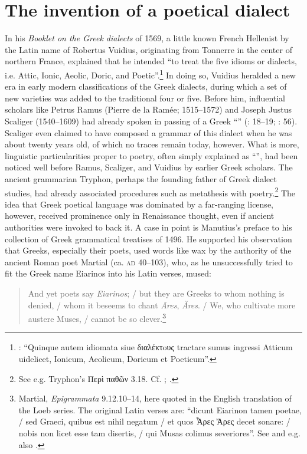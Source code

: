 \section{The invention of a poetical dialect}\label{sec:2.7}

In his \textit{Booklet on the Greek dialects} of 1569, a little known French Hellenist by the Latin name of Robertus Vuidius, originating from Tonnerre in the center of northern France, explained that he intended “to treat the five idioms or dialects, i.e. Attic, Ionic, Aeolic, Doric, and Poetic”.\footnote{\citet[137\textsc{\textsuperscript{v}}]{Vuidius1569}: “Quinque autem idiomata siue διαλέκτoυς tractare sumus ingressi Atticum uidelicet, Ionicum, Aeolicum, Doricum et Poeticum”.} In doing so, Vuidius heralded a new era in early modern classifications of the Greek dialects, during which a set of new varieties was added to the traditional four or five. Before him, influential scholars like Petrus Ramus (Pierre de la Ramée; 1515–1572) and Joseph Justus Scaliger (1540–1609) had already spoken in passing of a Greek “” (\citealt{Ramus1560}: 18–19; \citealt{Scaliger1594}: 56). Scaliger even claimed to have composed a grammar of this dialect when he was about twenty years old, of which no traces remain today, however. What is more, linguistic particularities proper to poetry, often simply explained as “”, had been noticed well before Ramus, Scaliger, and Vuidius by earlier Greek scholars. The ancient grammarian Tryphon, perhaps the founding father of Greek dialect studies, had already associated procedures such as metathesis with poetry.\footnote{See e.g. Tryphon’s Περὶ παθῶν 3.18. Cf. ; \citet[209, 230, 235]{Vergara1537}.} The idea that Greek poetical language was dominated by a far-ranging license, however, received prominence only in Renaissance thought, even if ancient authorities were invoked to back it. A case in point is Manutius’s preface to his collection of Greek grammatical treatises of 1496. He supported his observation that Greeks, especially their poets, used words like wax by the authority of the ancient Roman poet Martial (ca. \textsc{ad} 40–103), who, as he unsuccessfully tried to fit the Greek name Eiarinos into his Latin verses, mused:

\begin{quote}
And yet poets say \textit{Eiarinos}; / but they are Greeks to whom nothing is denied, / whom it beseems to chant \textit{Āres}, \textit{Ăres}. / We, who cultivate more austere Muses, / cannot be so clever.\footnote{Martial, \textit{Epigrammata} 9.12.10–14, here quoted in the English translation of the Loeb series. The original Latin verses are: “dicunt Eiarinon tamen poetae, / sed Graeci, quibus est nihil negatum / et quos Ἆρες Ἄρες decet sonare: / nobis non licet esse tam disertis, / qui Musas colimus severiores”. See \citet[*.ii\textsc{\textsuperscript{v}}]{Manutius1496Aldus} and e.g. also \citet[187\textsc{\textsuperscript{r}}]{Enoch1555}.}
\end{quote}

